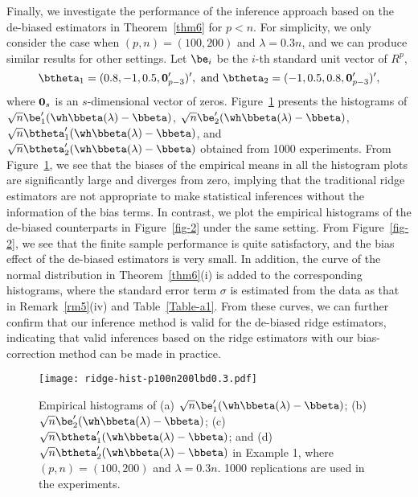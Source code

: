 Finally, we investigate the performance of the inference approach based on the de-biased estimators in Theorem~\ref{thm6} for $p<n$. For simplicity, we only consider the case when $(p,n)=(100,200)$ and $\lambda=0.3n$, and we can produce similar results for other settings. Let $\be_i$ be the $i$-th standard unit vector of $R^p$, 
\[\btheta_1=(0.8,-1,0.5,{\bf 0}_{p-3}')',\,\,\text{and}\,\,\btheta_2=(-1,0.5,0.8,{\bf 0}_{p-3}')',\]
where ${\bf 0}_s$ is an $s$-dimensional  vector of zeros. Figure~\ref{fig-1} presents the histograms of $\sqrt{n}\be_1'(\wh\bbeta(\lambda)-\bbeta)$, $\sqrt{n}\be_2'(\wh\bbeta(\lambda)-\bbeta)$, $\sqrt{n}\btheta_1'(\wh\bbeta(\lambda)-\bbeta)$, and $\sqrt{n}\btheta_2'(\wh\bbeta(\lambda)-\bbeta)$ obtained from 1000 experiments. From Figure~\ref{fig-1}, we see that the biases of the empirical means in all the histogram plots are significantly large and diverges from zero, implying that the traditional ridge estimators are not appropriate to make statistical inferences without the information of the bias terms. In contrast, we plot the empirical histograms of the de-biased counterparts in Figure~\ref{fig-2} under the same setting.  From Figure~\ref{fig-2}, we see that the finite sample performance is quite satisfactory, and the bias effect of the de-biased estimators is very small. In addition, the curve of the normal distribution in Theorem~\ref{thm6}(i) is added to the corresponding histograms, where the standard error term $\sigma$ is estimated from the data as that in Remark~\ref{rm5}(iv) and Table~\ref{Table-a1}. From these curves, we can further confirm that our inference method is valid for the de-biased ridge estimators, indicating that valid inferences based on the  ridge estimators with our bias-correction method can be made in practice.\\



\begin{figure}[ht]
\begin{center}
{\texttt{[image: ridge-hist-p100n200lbd0.3.pdf]}}
\caption{  Empirical histograms of (a) $\sqrt{n}\be_1'(\wh\bbeta(\lambda)-\bbeta)$; (b)  $\sqrt{n}\be_2'(\wh\bbeta(\lambda)-\bbeta)$; (c) $\sqrt{n}\btheta_1'(\wh\bbeta(\lambda)-\bbeta)$; and (d) $\sqrt{n}\btheta_2'(\wh\bbeta(\lambda)-\bbeta)$ in Example 1, where $(p,n)=(100,200)$ and $\lambda=0.3n$. 1000 replications are used in the experiments.  }\label{fig-1}
\end{center}
\end{figure}


